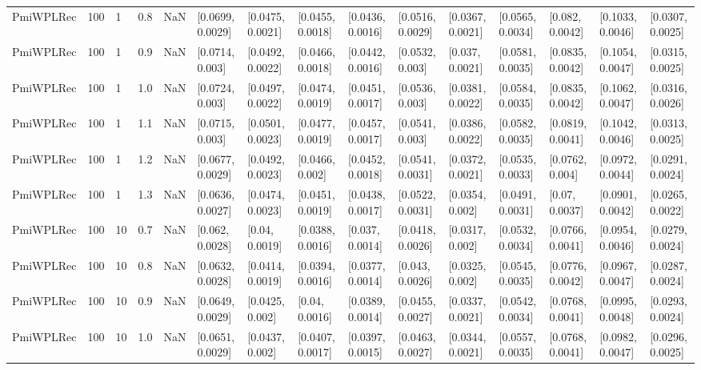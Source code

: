 \begin{tabular}{lllrrllllllllll}
 PmiWPLRec &  100 &     1 &   0.8 &   NaN &  [0.0699, 0.0029] &  [0.0475, 0.0021] &  [0.0455, 0.0018] &  [0.0436, 0.0016] &  [0.0516, 0.0029] &  [0.0367, 0.0021] &  [0.0565, 0.0034] &   [0.082, 0.0042] &  [0.1033, 0.0046] &  [0.0307, 0.0025] \\
 PmiWPLRec &  100 &     1 &   0.9 &   NaN &   [0.0714, 0.003] &  [0.0492, 0.0022] &  [0.0466, 0.0018] &  [0.0442, 0.0016] &   [0.0532, 0.003] &   [0.037, 0.0021] &  [0.0581, 0.0035] &  [0.0835, 0.0042] &  [0.1054, 0.0047] &  [0.0315, 0.0025] \\
 PmiWPLRec &  100 &     1 &   1.0 &   NaN &   [0.0724, 0.003] &  [0.0497, 0.0022] &  [0.0474, 0.0019] &  [0.0451, 0.0017] &   [0.0536, 0.003] &  [0.0381, 0.0022] &  [0.0584, 0.0035] &  [0.0835, 0.0042] &  [0.1062, 0.0047] &  [0.0316, 0.0026] \\
 PmiWPLRec &  100 &     1 &   1.1 &   NaN &   [0.0715, 0.003] &  [0.0501, 0.0023] &  [0.0477, 0.0019] &  [0.0457, 0.0017] &   [0.0541, 0.003] &  [0.0386, 0.0022] &  [0.0582, 0.0035] &  [0.0819, 0.0041] &  [0.1042, 0.0046] &  [0.0313, 0.0025] \\
 PmiWPLRec &  100 &     1 &   1.2 &   NaN &  [0.0677, 0.0029] &  [0.0492, 0.0023] &   [0.0466, 0.002] &  [0.0452, 0.0018] &  [0.0541, 0.0031] &  [0.0372, 0.0021] &  [0.0535, 0.0033] &   [0.0762, 0.004] &  [0.0972, 0.0044] &  [0.0291, 0.0024] \\
 PmiWPLRec &  100 &     1 &   1.3 &   NaN &  [0.0636, 0.0027] &  [0.0474, 0.0023] &  [0.0451, 0.0019] &  [0.0438, 0.0017] &  [0.0522, 0.0031] &   [0.0354, 0.002] &  [0.0491, 0.0031] &    [0.07, 0.0037] &  [0.0901, 0.0042] &  [0.0265, 0.0022] \\
 PmiWPLRec &  100 &    10 &   0.7 &   NaN &   [0.062, 0.0028] &    [0.04, 0.0019] &  [0.0388, 0.0016] &   [0.037, 0.0014] &  [0.0418, 0.0026] &   [0.0317, 0.002] &  [0.0532, 0.0034] &  [0.0766, 0.0041] &  [0.0954, 0.0046] &  [0.0279, 0.0024] \\
 PmiWPLRec &  100 &    10 &   0.8 &   NaN &  [0.0632, 0.0028] &  [0.0414, 0.0019] &  [0.0394, 0.0016] &  [0.0377, 0.0014] &   [0.043, 0.0026] &   [0.0325, 0.002] &  [0.0545, 0.0035] &  [0.0776, 0.0042] &  [0.0967, 0.0047] &  [0.0287, 0.0024] \\
 PmiWPLRec &  100 &    10 &   0.9 &   NaN &  [0.0649, 0.0029] &   [0.0425, 0.002] &    [0.04, 0.0016] &  [0.0389, 0.0014] &  [0.0455, 0.0027] &  [0.0337, 0.0021] &  [0.0542, 0.0034] &  [0.0768, 0.0041] &  [0.0995, 0.0048] &  [0.0293, 0.0024] \\
 PmiWPLRec &  100 &    10 &   1.0 &   NaN &  [0.0651, 0.0029] &   [0.0437, 0.002] &  [0.0407, 0.0017] &  [0.0397, 0.0015] &  [0.0463, 0.0027] &  [0.0344, 0.0021] &  [0.0557, 0.0035] &  [0.0768, 0.0041] &  [0.0982, 0.0047] &  [0.0296, 0.0025] \\

\end{tabular}
